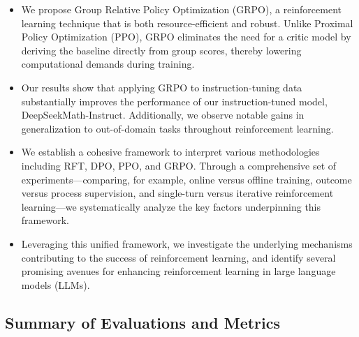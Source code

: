 \begin{itemize}[topsep=0pt]
    \item We propose Group Relative Policy Optimization (GRPO), a reinforcement learning technique that is both resource-efficient and robust. Unlike Proximal Policy Optimization (PPO), GRPO eliminates the need for a critic model by deriving the baseline directly from group scores, thereby lowering computational demands during training.
    \item Our results show that applying GRPO to instruction-tuning data substantially improves the performance of our instruction-tuned model, DeepSeekMath-Instruct. Additionally, we observe notable gains in generalization to out-of-domain tasks throughout reinforcement learning.
    \item We establish a cohesive framework to interpret various methodologies including RFT, DPO, PPO, and GRPO. Through a comprehensive set of experiments—comparing, for example, online versus offline training, outcome versus process supervision, and single-turn versus iterative reinforcement learning—we systematically analyze the key factors underpinning this framework.
    \item Leveraging this unified framework, we investigate the underlying mechanisms contributing to the success of reinforcement learning, and identify several promising avenues for enhancing reinforcement learning in large language models (LLMs).
\end{itemize}

\subsection{Summary of Evaluations and Metrics}

